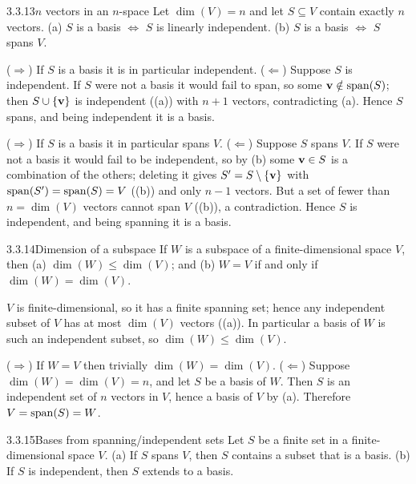 \begin{thms}{3.3.13}{$n$ vectors in an $n$-space}
Let $\dim(V)=n$ and let $S\subseteq V$ contain exactly $n$ vectors.
\textup{(a)} $S$ is a basis $\iff$ $S$ is linearly independent.
\textup{(b)} $S$ is a basis $\iff$ $S$ spans $V$.
\end{thms}

\begin{prf}
 ($\Rightarrow$) If $S$ is a basis it is in particular independent.
($\Leftarrow$) Suppose $S$ is independent. If $S$ were not a basis it would fail to span, so some $\mathbf{v}\notin\operatorname{span}(S)$; then $S\cup\{\mathbf{v}\}$ is independent ((a)) with $n+1$ vectors, contradicting (a). Hence $S$ spans, and being independent it is a basis.

 ($\Rightarrow$) If $S$ is a basis it in particular spans $V$.
($\Leftarrow$) Suppose $S$ spans $V$. If $S$ were not a basis it would fail to be independent, so by (b) some $\mathbf{v}\in S$ is a combination of the others; deleting it gives $S'=S\setminus\{\mathbf{v}\}$ with $\operatorname{span}(S')=\operatorname{span}(S)=V$ ((b)) and only $n-1$ vectors. But a set of fewer than $n=\dim(V)$ vectors cannot span $V$ ((b)), a contradiction. Hence $S$ is independent, and being spanning it is a basis.
\end{prf}

\begin{thms}{3.3.14}{Dimension of a subspace}
If $W$ is a subspace of a finite-dimensional space $V$, then
\textup{(a)} $\dim(W)\le\dim(V)$; and
\textup{(b)} $W=V$ if and only if $\dim(W)=\dim(V)$.
\end{thms}

\begin{prf}
 $V$ is finite-dimensional, so it has a finite spanning set; hence any independent subset of $V$ has at most $\dim(V)$ vectors ((a)). In particular a basis of $W$ is such an independent subset, so $\dim(W)\le\dim(V)$.

 ($\Rightarrow$) If $W=V$ then trivially $\dim(W)=\dim(V)$.
($\Leftarrow$) Suppose $\dim(W)=\dim(V)=n$, and let $S$ be a basis of $W$. Then $S$ is an independent set of $n$ vectors in $V$, hence a basis of $V$ by (a). Therefore $V=\operatorname{span}(S)=W$.
\end{prf}

\begin{thms}{3.3.15}{Bases from spanning/independent sets}
Let $S$ be a finite set in a finite-dimensional space $V$.
\textup{(a)} If $S$ spans $V$, then $S$ contains a subset that is a basis.
\textup{(b)} If $S$ is independent, then $S$ extends to a basis.
\end{thms}


